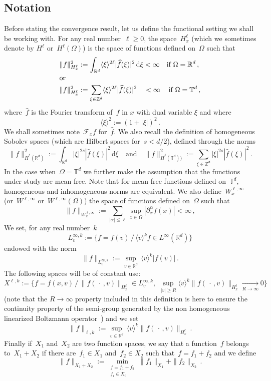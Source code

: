 \documentclass[11pt]{article}
\theoremstyle{definition}
\numberwithin{equation}{section}
\numberwithin{figure}{section}
\numberwithin{table}{section}
\newcommand*{\dd}{\mathrm{d}}
\newcommand*{\dxi}{\dd \xi}
\newcommand*\R {\mathbb{R}}
\newcommand*\T {\mathbb{T}}
\newcommand*\Z {\mathbb{Z}}
\newcommand{\f}{\tilde f}
\let\oldtilde\tilde
\renewcommand*{\tilde}[1]{\mathchoice{\widetilde{#1}}{\widetilde{#1}}{\oldtilde{#1}}{\oldtilde{#1}}}
\begin{document}
\subsection{Notation}
Before stating the convergence result, let us define the functional setting we shall be working with. For any real number~$\ell\geq 0$, the space~$H^\ell_x$ (which we sometimes denote by $H^\ell$ or~$H^\ell(\Omega)$) is the space of functions defined on~$\Omega$ such that
\begin{align*}
\|f\|_{H^\ell_x}^2 &:=\int_{\R^d} \langle \xi\rangle^{2\ell} |\widehat f (\xi)|^2\, \dxi <\infty \quad\text{if } \Omega = \R^d \,,\\
\intertext{or}
\|f\|_{H^\ell_x}^2 &:=\sum_{\xi \in \Z^d} \langle \xi\rangle^{2\ell} |\widehat f (\xi)|^2 \quad<\infty \phantom{\, \dxi}\text{if } \Omega = \T^d \,,
\end{align*}
where~$\widehat f $ is the Fourier transform of~$f$ in $x$ with dual variable $\xi$ and where
\[
\langle \xi\rangle^{2 }:= (1+|\xi|)^2\,.
\]
We shall sometimes note~${\mathcal F}_x f$ for~$\widehat f$. We also recall the definition of homogeneous Sobolev spaces (which are Hilbert spaces for~$s<d/2$), defined through the norms
\[
\|f\|_{ \dot H^s(\R^d)}^2:= \int_{\R^d} | \xi |^{2s} |\widehat f(\xi)|^2 \, \dxi \quad \text{and} \quad \|f\|_{ \dot H^s(\T^d))}^2:=\sum_{\xi \in \Z^d} | \xi |^{2s} |\widehat f(\xi)|^2 \,.
\]
In the case when~$ \Omega = \T^d$ we further make the assumption that the functions under study are mean free. Note that for mean free functions defined on~$\T^d$, homogeneous and inhomogeneous norms are equivalent. We also define~$W^{\ell,\infty}_x$ (or~$W^{\ell,\infty}$ or~$W^{\ell,\infty}(\Omega)$) the space of functions defined on~$\Omega$ such that
\[
\|f\|_{W^{\ell,\infty}_x} :=\sum_{|\alpha| \le \ell} \sup_{x \in \Omega}|\partial^\alpha_x f(x)|<\infty \,,
\]
We set, for any real number~$k$
\[
L^{\infty,k}_v :=\Big\{f = f(v) \, / \, \langle v\rangle^k f \in L^\infty (\R^d)\Big\}
\]
endowed with the norm
\[
\|f\|_{L^{\infty,k}_v}:=\sup_{v\in\R^d} \, \langle v\rangle^k |f(v) | \,.
\]
The following spaces will be of constant use:
\begin{equation}\label{Xellk}
X^{\ell,k}:=\Big\{f = f(x,v) \, / \,\|f(\,\cdot\,,v)\|_{H^\ell_x}\in L^{\infty,k}_v, \, \, \sup_{|v| \ge R} \langle v\rangle^k \|f(\,\cdot\,,v)\|_{H^\ell_x} \xrightarrow[R \to \infty]{}0\Big\}
\end{equation}
(note that the $R\to\infty$ property included in this definition is here to ensure the continuity property of the semi-group generated by the non homogeneous linearized Boltzmann operator~\cite{Ukai}) and we set
\[
\|f\|_{\ell,k}:=\sup_{v\in\R^d} \, \langle v\rangle^k \big\|f(\,\cdot\,,v)\big\|_{H^\ell_x}\,.
\]
Finally if~$X_1$ and~$X_2$ are two function spaces, we say that a function~$f$ belongs to~$X_1+X_2$ if there are~$f_1 \in X_1$ and~$f_2\in X_2$ such that~$f =f_1+f_2$ and we define
\[
\|f\|_{X_1+X_2} := \min_{
\begin{smallmatrix}f = f_1+f_2\\f_i \in X_i
\end{smallmatrix}}\|f_1\|_{X_1} + \|f_2\|_{X_2} \,.
\]
\end{document}
